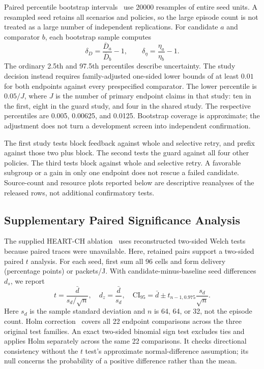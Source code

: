 \documentclass[journal,10pt]{IEEEtran}
\begin{document}
Paired percentile bootstrap intervals~\cite{efron} use 20000 resamples of entire seed units. A resampled seed retains all scenarios and policies, so the large episode count is not treated as a large number of independent replications. For candidate $a$ and comparator $b$, each bootstrap sample computes
\begin{equation}
\delta_D=\frac{\overline D_a}{\overline D_b}-1,\qquad
\delta_\eta=\frac{\eta_a}{\eta_b}-1.
\label{eq:gain}
\end{equation}
The ordinary 2.5th and 97.5th percentiles describe uncertainty. The study decision instead requires family-adjusted one-sided lower bounds of at least $0.01$ for both endpoints against every prespecified comparator. The lower percentile is $0.05/J$, where $J$ is the number of primary endpoint claims in that study: ten in the first, eight in the guard study, and four in the shared study. The respective percentiles are 0.005, 0.00625, and 0.0125. Bootstrap coverage is approximate; the adjustment does not turn a development screen into independent confirmation.

The first study tests block feedback against whole and selective retry, and prefix against those two plus block. The second tests the guard against all four other policies. The third tests block against whole and selective retry. A favorable subgroup or a gain in only one endpoint does not rescue a failed candidate. Source-count and resource plots reported below are descriptive reanalyses of the released rows, not additional confirmatory tests.

\subsection{Supplementary Paired Significance Analysis}
The supplied HEART-CH ablation~\cite{heart} uses reconstructed two-sided Welch tests because paired traces were unavailable. Here, retained pairs support a two-sided paired $t$ analysis. For each seed, first sum all 96 cells and form delivery (percentage points) or packets/J. With candidate-minus-baseline seed differences $d_s$, we report
\begin{equation}
t=\frac{\bar d}{s_d/\sqrt{n}},\quad d_z=\frac{\bar d}{s_d},\quad
\mathrm{CI}_{95}=\bar d\pm t_{n-1,0.975}\frac{s_d}{\sqrt n}.
\end{equation}
Here $s_d$ is the sample standard deviation and $n$ is 64, 64, or 32, not the episode count. Holm correction~\cite{holm} covers all 22 endpoint comparisons across the three original test families. An exact two-sided binomial sign test excludes ties and applies Holm separately across the same 22 comparisons. It checks directional consistency without the $t$ test's approximate normal-difference assumption; its null concerns the probability of a positive difference rather than the mean.
\end{document}
